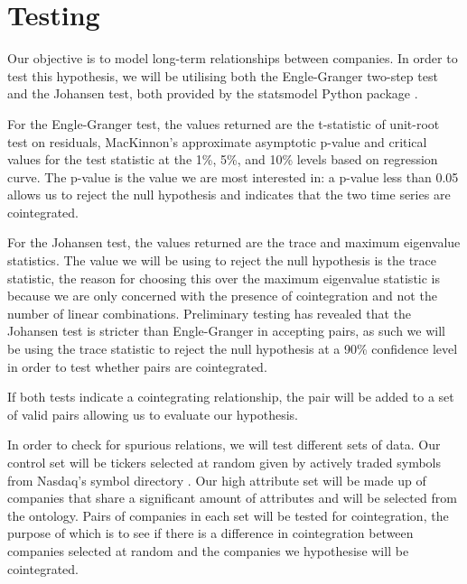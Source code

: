\documentclass{UoYCSproject}
\begin{document}
\section{Testing}

Our objective is to model long-term relationships between companies. In order to test this hypothesis, we will be utilising both the Engle-Granger two-step test and the Johansen test, both provided by the statsmodel Python package \parencite{statsmodelenglegranger} \parencite{statsmodeljohansen}.

For the Engle-Granger test, the values returned are the t-statistic of unit-root test on residuals, MacKinnon’s approximate asymptotic p-value \parencite{mackinnon} and critical values for the test statistic at the 1\%, 5\%, and 10\% levels based on regression curve. The p-value is the value we are most interested in: a p-value less than 0.05 allows us to reject the null hypothesis and indicates that the two time series are cointegrated.

For the Johansen test, the values returned are the trace and maximum eigenvalue statistics. The value we will be using to reject the null hypothesis is the trace statistic, the reason for choosing this over the maximum eigenvalue statistic is because we are only concerned with the presence of cointegration and not the number of linear combinations. Preliminary testing has revealed that the Johansen test is stricter than Engle-Granger in accepting pairs, as such we will be using the trace statistic to reject the null hypothesis at a 90\% confidence level in order to test whether pairs are cointegrated.

If both tests indicate a cointegrating relationship, the pair will be added to a set of valid pairs allowing us to evaluate our hypothesis.

In order to check for spurious relations, we will test different sets of data. Our control set will be tickers selected at random given by actively traded symbols from Nasdaq's symbol directory \parencite{nasdaq}. Our high attribute set will be made up of companies that share a significant amount of attributes and will be selected from the ontology. Pairs of companies in each set will be tested for cointegration, the purpose of which is to see if there is a difference in cointegration between companies selected at random and the companies we hypothesise will be cointegrated.
\end{document}
